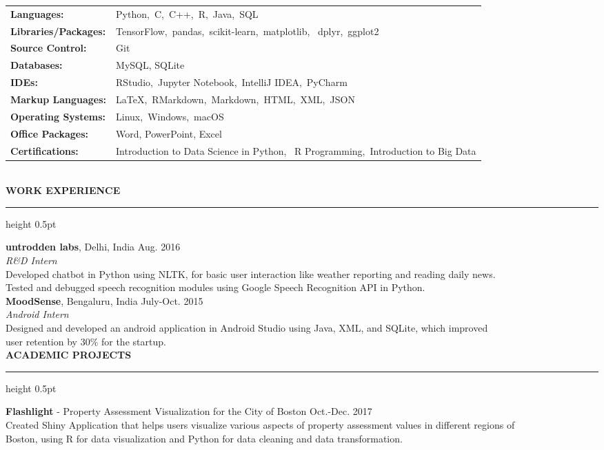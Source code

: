 \documentclass[a4paper]{article}
\newcommand{\myline}{\par
  \kern2pt %
  \hrule height 0.5pt
  \kern2pt %
}
\newcommand{\mybullet}{
	\indent \textbullet \hspace*{2mm}
}
\begin{document}
	\noindent
	\begin{tabular}{ m{3.5cm} l }
		\textbf{Languages: } & Python,\ C,\ C++,\ R,\ Java,\ SQL \\ 
		\textbf{Libraries/Packages: } & TensorFlow,\ pandas,\ scikit-learn,\ matplotlib,
                \ dplyr,\ ggplot2 \\
		\textbf{Source Control: } & Git	\\
		\textbf{Databases: } & MySQL, SQLite\\
		\textbf{IDEs: } & RStudio,\ Jupyter Notebook,\ IntelliJ IDEA,\ PyCharm\\
		\textbf{Markup Languages: } & LaTeX,\ RMarkdown,\ Markdown,\ HTML,\ XML,\ JSON \\
		\textbf{Operating Systems: } & Linux,\ Windows,\ macOS \\
		\textbf{Office Packages: } & Word, PowerPoint, Excel \\
		\textbf{Certifications: } & Introduction to Data Science in Python,
                \ R Programming,\ Introduction to Big Data \\
	\end{tabular} \\

	\smallskip
	\smallskip
	\noindent
	{\large \textbf{WORK EXPERIENCE}}
	\myline 
	\smallskip
	
	\noindent
	\textbf{untrodden labs}, Delhi, India \hfill Aug. 2016 \\
        \textit{R\&D Intern}\\
        \mybullet Developed chatbot in Python using NLTK, for basic user interaction like 
        weather reporting and reading daily news. \\
	\mybullet Tested and debugged speech recognition modules using Google Speech 
        Recognition API in Python. \\
	
	\noindent
	\textbf{MoodSense}, Bengaluru, India \hfill July-Oct. 2015 \\
	\textit{Android Intern} \\
	\mybullet Designed and developed an android application in Android Studio using Java, 
        XML, and SQLite, which improved \\ 
	\indent\indent user retention by 30\% for the startup. \\
	
        \noindent
	{\large \textbf{ACADEMIC PROJECTS}}
	\myline 
	\smallskip

        \noindent
        \textbf{Flashlight} - Property Assessment Visualization for the City of Boston 
        \hfill Oct.-Dec. 2017 \\
        \mybullet Created Shiny Application that helps users visualize various aspects of 
        property assessment values in different regions of \\ \indent\indent Boston, using 
        R for data visualization and Python for data cleaning and data transformation. \\
        
\end{document}
